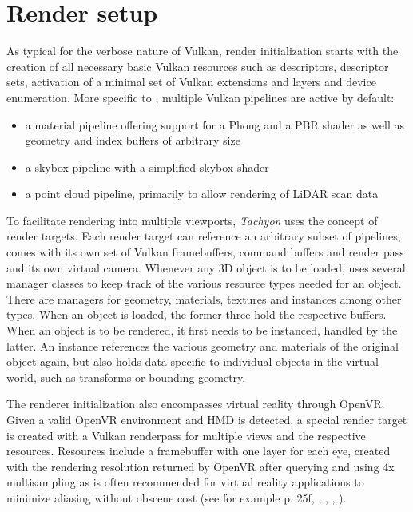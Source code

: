 \section{Render setup} 
As typical for the verbose nature of Vulkan, render initialization starts with the creation of all necessary basic Vulkan resources such as descriptors, descriptor sets, activation of a minimal set of Vulkan extensions and layers and device enumeration. 
More specific to , multiple Vulkan pipelines are active by default:
\begin{itemize}
\item a material pipeline offering support for a Phong and a PBR shader as well as geometry and index buffers of arbitrary size
\item a skybox pipeline with a simplified skybox shader
\item a point cloud pipeline, primarily to allow rendering of LiDAR scan data
\end{itemize}
To facilitate rendering into multiple viewports, \textit{Tachyon} uses the concept of render targets. Each render target can reference an arbitrary subset of pipelines, comes with its own set of Vulkan framebuffers, command buffers and render pass and its own virtual camera. 
Whenever any 3D object is to be loaded,  uses several manager classes to keep track of the various resource types needed for an object. There are managers for geometry, materials, textures and instances among other types. When an object is loaded, the former three hold the respective buffers. When an object is to be rendered, it first needs to be instanced, handled by the latter. An instance references the various geometry and materials of the original object again, but also holds data specific to individual objects in the virtual world, such as transforms or bounding geometry. 

The renderer initialization also encompasses virtual reality through OpenVR. Given a valid OpenVR environment and HMD is detected, a special render target is created with a Vulkan renderpass for multiple views and the respective resources. Resources include a framebuffer with one layer for each eye, created with the rendering resolution returned by OpenVR after querying  and using 4x multisampling as is often recommended for virtual reality applications to minimize aliasing without obscene cost (see for example \cite{Vlachos.2015} p. 25f, \cite{Porter.2017}, \cite{Carmack.2016}, \cite{VisCircleGmbH.2018}, \cite{Pettit.2017}). 


